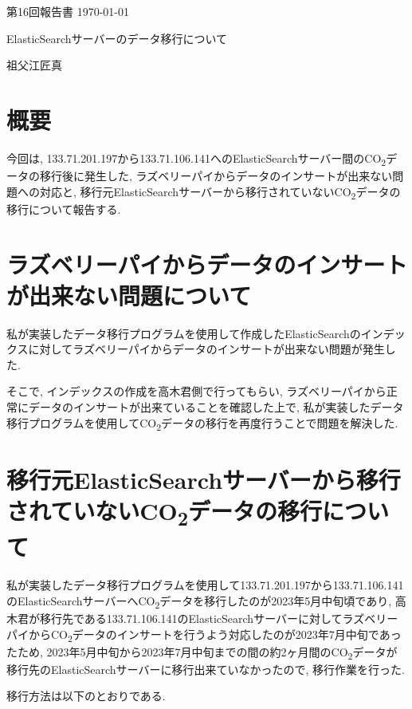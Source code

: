 \documentclass[a4j,12pt,]{jarticle}
\begin{document}
{\noindent\small 第16回報告書 \hfill\today}
\begin{center}
  {\Large ElasticSearchサーバーのデータ移行について}
\end{center}
\begin{flushright}
  祖父江匠真 \\
\end{flushright}

\section{概要}
今回は, 133.71.201.197から133.71.106.141へのElasticSearchサーバー間のCO\textsubscript{2}データの移行後に発生した, ラズベリーパイからデータのインサートが出来ない問題への対応と, 移行元ElasticSearchサーバーから移行されていないCO\textsubscript{2}データの移行について報告する.

\section{ラズベリーパイからデータのインサートが出来ない問題について}

私が実装したデータ移行プログラムを使用して作成したElasticSearchのインデックスに対してラズベリーパイからデータのインサートが出来ない問題が発生した.

そこで, インデックスの作成を高木君側で行ってもらい, ラズベリーパイから正常にデータのインサートが出来ていることを確認した上で, 私が実装したデータ移行プログラムを使用してCO\textsubscript{2}データの移行を再度行うことで問題を解決した.

\section{移行元ElasticSearchサーバーから移行されていないCO\textsubscript{2}データの移行について}

私が実装したデータ移行プログラムを使用して133.71.201.197から133.71.106.141のElasticSearchサーバーへCO\textsubscript{2}データを移行したのが2023年5月中旬頃であり, 高木君が移行先である133.71.106.141のElasticSearchサーバーに対してラズベリーパイからCO\textsubscript{2}データのインサートを行うよう対応したのが2023年7月中旬であったため, 2023年5月中旬から2023年7月中旬までの間の約2ヶ月間のCO\textsubscript{2}データが移行先のElasticSearchサーバーに移行出来ていなかったので, 移行作業を行った.

移行方法は以下のとおりである.
\end{document}
